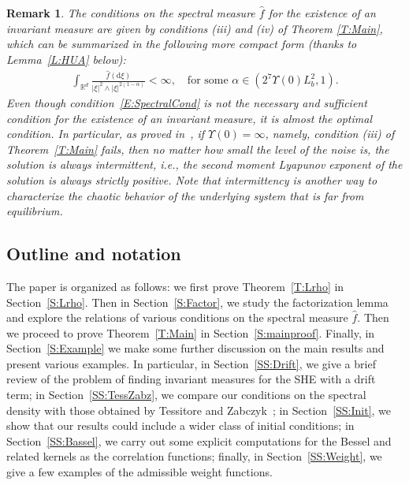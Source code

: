 \documentclass[sn-mathphys]{sn-jnl}%
\newcommand{\BR}{\mathbb{R}}
\newcommand{\ud}{\ensuremath{\mathrm{d}}}
\numberwithin{equation}{section}
\theoremstyle{thmstyleone}%
\theoremstyle{thmstyletwo}%
\newtheorem{remark}{Remark}[section]%
\theoremstyle{thmstylethree}%
\begin{document}
\begin{remark}\label{R:CompactForm}
  The conditions on the spectral measure $\widehat{f}$ for the existence of an invariant measure are
  given by conditions (iii) and (iv) of Theorem \ref{T:Main}, which can be summarized in the
  following more compact form (thanks to Lemma~\ref{L:HUA} below):
  \begin{align}\label{E:SpectralCond}
    \int_{\BR^d} \frac{\widehat{f}(\ud\xi)}{\lvert \xi \rvert^2 \wedge \lvert \xi \rvert^{2(1-\alpha)}}<\infty,
    \quad \text{for some $\alpha\in \left(2^7\Upsilon(0)L_b^2,1\right)$.}
  \end{align}
  Even though condition~\eqref{E:SpectralCond} is not the necessary and sufficient condition for the
  existence of an invariant measure, it is almost the optimal condition. In particular, as proved
  in~\cite{chen.kim:19:nonlinear}, if $\Upsilon(0) = \infty$, namely, condition (iii) of
  Theorem~\ref{T:Main} fails, then no matter how small the level of the noise is, the solution is
  always intermittent, i.e., the second moment Lyapunov exponent of the solution is always strictly
  positive. Note that intermittency is another way to characterize the chaotic behavior of the
  underlying system that is far from equilibrium.
\end{remark}

\subsection{Outline and notation}

The paper is organized as follows: we first prove Theorem~\ref{T:Lrho} in Section~\ref{S:Lrho}. Then
in Section~\ref{S:Factor}, we study the factorization lemma and explore the relations of various
conditions on the spectral measure $\widehat{f}$. Then we proceed to prove Theorem~\ref{T:Main} in
Section~\ref{S:mainproof}. Finally, in Section~\ref{S:Example} we make some further discussion on
the main results and present various examples. In particular, in Section~\ref{SS:Drift}, we give a
brief review of the problem of finding invariant measures for the SHE with a drift term; in
Section~\ref{SS:TessZabz}, we compare our conditions on the spectral density with those obtained by
Tessitore and Zabczyk~\cite{tessitore.zabczyk:98:invariant}; in Section~\ref{SS:Init}, we show that
our results could include a wider class of initial conditions; in Section~\ref{SS:Bassel}, we carry
out some explicit computations for the Bessel and related kernels as the correlation functions;
finally, in Section~\ref{SS:Weight}, we give a few examples of the admissible weight functions.
\end{document}
